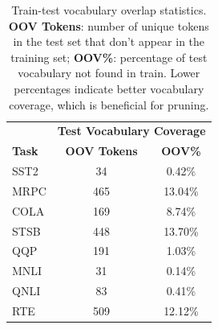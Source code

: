 \documentclass[twocolumn]{article}
\begin{document}
\begin{table}[htbp]
\centering
\scriptsize
\setlength{\tabcolsep}{4pt}
\begin{tabular}{l|cc}
\toprule
& \multicolumn{2}{c}{\textbf{Test Vocabulary Coverage}} \\
\textbf{Task} & \textbf{OOV Tokens} & \textbf{OOV\%} \\
\midrule
SST2 & 34 & 0.42\% \\
MRPC & 465 & 13.04\% \\
COLA & 169 & 8.74\% \\
STSB & 448 & 13.70\% \\
QQP & 191 & 1.03\% \\
MNLI & 31 & 0.14\% \\
QNLI & 83 & 0.41\% \\
RTE & 509 & 12.12\% \\
\bottomrule
\end{tabular}
\caption{Train-test vocabulary overlap statistics. \textbf{OOV Tokens}: number of unique tokens in the test set that don't appear in the training set; \textbf{OOV\%}: percentage of test vocabulary not found in train. Lower percentages indicate better vocabulary coverage, which is beneficial for pruning.}
\label{tab:vocab_overlap}
\end{table}
\end{document}
